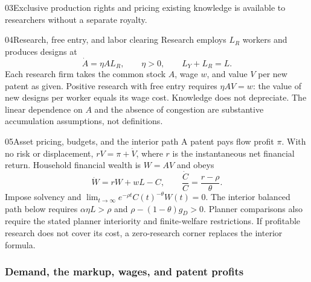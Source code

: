 \begin{modelsetup}[1]
\begin{modelcondition}{03}{Exclusive production rights and pricing}
existing knowledge is available to researchers without a separate royalty.
\end{modelcondition}
\begin{modelcondition}{04}{Research, free entry, and labor clearing}
Research employs $L_R$ workers and produces designs at
\[
\dot A=\eta A L_R,\qquad \eta>0,\qquad L_Y+L_R=L.
\]
Each research firm takes the common stock $A$, wage $w$, and value $V$ per
new patent as given. Positive research with free entry requires
$\eta A V=w$: the value of new designs per worker equals its wage cost.
Knowledge does not depreciate. The linear dependence on $A$ and the absence
of congestion are substantive accumulation assumptions, not definitions.
\end{modelcondition}
\begin{modelcondition}{05}{Asset pricing, budgets, and the interior path}
A patent pays flow profit $\pi$. With no risk or displacement,
$rV=\pi+\dot V$, where $r$ is the instantaneous net financial return.
Household financial wealth is $W=AV$ and obeys
\[
\dot W=rW+wL-C,\qquad
\frac{\dot C}{C}=\frac{r-\rho}{\theta}.
\]
Impose solvency and
$\lim_{t\to\infty}e^{-\rho t}C(t)^{-\theta}W(t)=0$.
The interior balanced path below requires $\alpha\eta L>\rho$ and
$\rho-(1-\theta)g_D>0$. Planner comparisons also require the stated planner
interiority and finite-welfare restrictions. If profitable research does not
cover its cost, a zero-research corner replaces the interior formula.
\end{modelcondition}
\end{modelsetup}

\subsubsection{Demand, the markup, wages, and patent profits}

